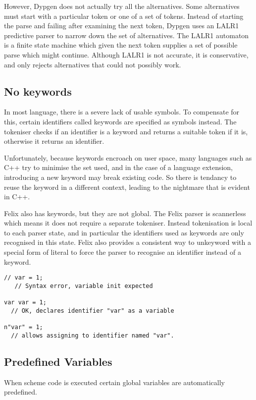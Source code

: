 \documentclass[oneside]{book}
\begin{document}
However, Dypgen does not actually try all the alternatives.
Some alternatives must start with a particular token
or one of a set of tokens. Instead of starting the parse
and failing after examining the next token, Dypgen
uses an LALR1 predictive parser to narrow down the
set of alternatives. The LALR1 automaton is a finite
state machine which given the next token supplies
a set of possible parse which might continue.
Although LALR1 is not accurate, it is conservative,
and only rejects alternatives that could not possibly
work.

\subsection{No keywords}
In most language, there is a severe lack of usable symbols.
To compensate for this, certain identifiers called keywords
are specified as symbols instead. The tokeniser checks if an
identifier is a keyword and returns a suitable token if it is,
otherwise it returns an identifier.

Unfortunately, because keywords encroach on user space,
many languages such as C++ try to minimise the set used,
and in the case of a language extension, introducing a new
keyword may break existing code. So there is tendancy to
reuse the keyword in a different context, leading to
the nightmare that is evident in C++.

Felix also has keywords, but they are not global.
The Felix parser is scannerless which means it does not
require a separate tokeniser. Instead tokenisation
is local to each parser state, and in particular
the identifiers used as keywords are only recognised
in this state. Felix also provides a consistent way
to unkeyword with a special form of literal to force
the parser to recognise an identifier instead of a keyword.

\begin{verbatim}
// var = 1; 
   // Syntax error, variable init expected

var var = 1; 
  // OK, declares identifier "var" as a variable

n"var" = 1; 
  // allows assigning to identifier named "var".
\end{verbatim}

\subsection{Predefined Variables}
When scheme code is executed certain global variables are
automatically predefined. 
\end{document}
